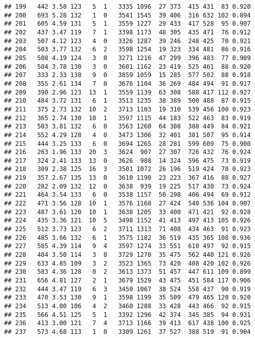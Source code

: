 \documentclass[]{article}
\begin{document}
\begin{verbatim}
## 199   442 3.58 123   5  1   3335 1096  27 373  415 431  83 0.920
## 200   693 5.28 132   1  0   3541 1545  39 406  316 632 102 0.894
## 201   605 4.59 131   5  1   3559 1227  29 433  417 528  95 0.907
## 202   437 3.47 119   7  1   3398 1173  48 305  435 471  76 0.912
## 203   507 4.12 123   4  0   3326 1287  39 246  248 425  70 0.921
## 204   503 3.77 132   6  2   3598 1254  19 323  334 481  86 0.916
## 205   508 4.19 124   3  0   3271 1216  47 299  396 483  77 0.909
## 206   504 3.78 130   3  0   3601 1162  23 419  525 461  88 0.920
## 207   333 2.33 138   9  0   3859 1059  15 285  577 502  88 0.918
## 208   355 2.61 134   7  0   3676 1104  36 269  484 494  91 0.917
## 209   390 2.96 123  13  1   3559 1139  63 308  588 417 112 0.927
## 210   484 3.72 131   6  1   3513 1235  38 389  500 488  87 0.915
## 211   375 2.73 132  10  2   3713 1103  19 310  539 456 100 0.923
## 212   365 2.74 130  10  1   3597 1115  44 183  522 463  83 0.919
## 213   503 3.81 132   6  0   3563 1260  64 308  388 449  84 0.921
## 214   552 4.29 128   4  0   3473 1306  32 401  381 507  95 0.914
## 215   444 3.25 133   6  0   3694 1265  28 281  599 609  75 0.900
## 216   263 1.96 133  20  3   3624  907  27 307  726 432  76 0.924
## 217   324 2.41 133  13  0   3626  988  14 324  596 475  73 0.919
## 218   309 2.38 125  16  3   3501 1072  26 196  519 424  70 0.923
## 219   357 2.67 135  13  0   3610 1190  23 223  367 416  88 0.927
## 220   282 2.09 132  12  0   3638  939  19 225  517 430  73 0.924
## 221   464 3.54 133   6  0   3538 1157  50 298  406 494  69 0.912
## 222   471 3.56 128  10  1   3576 1168  27 424  540 536 104 0.907
## 223   487 3.61 120  10  1   3638 1205  33 400  471 421  92 0.928
## 224   435 3.36 121  10  5   3498 1152  41 413  497 413 105 0.926
## 225   512 3.73 123   6  2   3711 1313  71 408  434 463  91 0.923
## 226   485 3.66 132   6  1   3575 1182  36 519  435 365 108 0.936
## 227   585 4.39 114   9  4   3597 1274  33 551  610 497  92 0.915
## 228   484 3.50 114   3  8   3729 1270  35 475  562 440 121 0.926
## 229   633 4.85 109   3  2   3523 1365  73 420  408 420 102 0.926
## 230   583 4.36 128   0  2   3613 1373  51 457  447 611 109 0.899
## 231   656 4.81 127   2  1   3679 1529  43 475  451 584 117 0.906
## 232   444 3.47 119   6  3   3450 1067  38 524  558 437  90 0.919
## 233   470 3.53 130   9  1   3598 1199  35 509  479 465 120 0.920
## 234   513 4.00 106   4  2   3460 1288  33 428  443 466  92 0.915
## 235   566 4.51 125   5  1   3392 1296  42 374  345 385  94 0.931
## 236   413 3.00 121   7  4   3713 1166  39 413  617 438 100 0.925
## 237   573 4.68 113   1  0   3309 1261  37 527  388 519  91 0.904

\end{verbatim}
\end{document}
